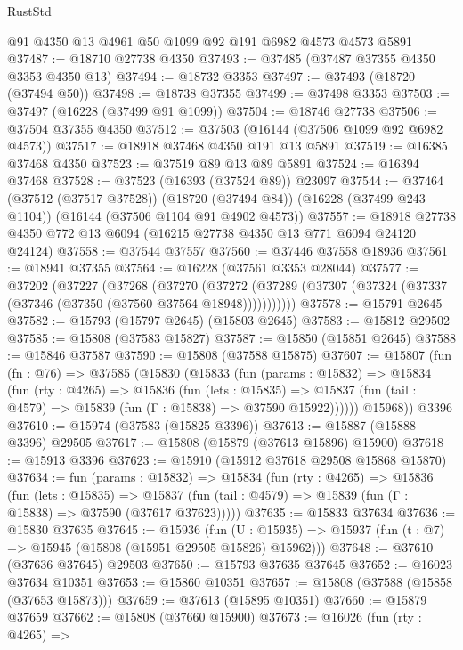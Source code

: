 \begin{lexlean}{RustStd}
\begin{coremodule}
    @91
    @4350
    @13
    @4961
    @50
    @1099
    @92
    @191
    @6982
    @4573
    @4573
    @5891
@37487 := @18710 @27738 @4350
@37493 := @37485 (@37487 @37355 @4350 @3353 @4350 @13)
@37494 := @18732 @3353
@37497 := @37493 (@18720 (@37494 @50))
@37498 := @18738 @37355
@37499 := @37498 @3353
@37503 := @37497 (@16228 (@37499 @91 @1099))
@37504 := @18746 @27738
@37506 := @37504 @37355 @4350
@37512 := @37503 (@16144 (@37506 @1099 @92 @6982 @4573))
@37517 := @18918 @37468 @4350 @191 @13 @5891
@37519 := @16385 @37468 @4350
@37523 := @37519 @89 @13 @89 @5891
@37524 := @16394 @37468
@37528 := @37523 (@16393 (@37524 @89)) @23097
@37544 := @37464
    (@37512 (@37517 @37528))
    (@18720 (@37494 @84))
    (@16228 (@37499 @243 @1104))
    (@16144 (@37506 @1104 @91 @4902 @4573))
@37557 := @18918 @27738 @4350 @772 @13 @6094 (@16215 @27738 @4350 @13 @771 @6094 @24120 @24124)
@37558 := @37544 @37557
@37560 := @37446 @37558 @18936
@37561 := @18941 @37355
@37564 := @16228 (@37561 @3353 @28044)
@37577 := @37202
    (@37227
      (@37268
        (@37270
          (@37272 (@37289 (@37307 (@37324 (@37337 (@37346 (@37350 (@37560 @37564 @18948)))))))))))
@37578 := @15791 @2645
@37582 := @15793 (@15797 @2645) (@15803 @2645)
@37583 := @15812 @29502
@37585 := @15808 (@37583 @15827)
@37587 := @15850 (@15851 @2645)
@37588 := @15846 @37587
@37590 := @15808 (@37588 @15875)
@37607 := @15807
    (fun (fn : @76) =>
    @37585
      (@15830
        (@15833
          (fun (params : @15832) =>
          @15834
            (fun (rty : @4265) =>
            @15836
              (fun (lets : @15835) =>
              @15837 (fun (tail : @4579) => @15839 (fun (Γ : @15838) => @37590 @15922))))))
        @15968))
    @3396
@37610 := @15974 (@37583 (@15825 @3396))
@37613 := @15887 (@15888 @3396) @29505
@37617 := @15808 (@15879 (@37613 @15896) @15900)
@37618 := @15913 @3396
@37623 := @15910 (@15912 @37618 @29508 @15868 @15870)
@37634 := fun (params : @15832) =>
  @15834
    (fun (rty : @4265) =>
    @15836
      (fun (lets : @15835) =>
      @15837 (fun (tail : @4579) => @15839 (fun (Γ : @15838) => @37590 (@37617 @37623)))))
@37635 := @15833 @37634
@37636 := @15830 @37635
@37645 := @15936
    (fun (U : @15935) => @15937 (fun (t : @7) => @15945 (@15808 (@15951 @29505 @15826) @15962)))
@37648 := @37610 (@37636 @37645) @29503
@37650 := @15793 @37635 @37645
@37652 := @16023 @37634 @10351
@37653 := @15860 @10351
@37657 := @15808 (@37588 (@15858 (@37653 @15873)))
@37659 := @37613 (@15895 @10351)
@37660 := @15879 @37659
@37662 := @15808 (@37660 @15900)
@37673 := @16026
    (fun (rty : @4265) =>

\end{coremodule}
\end{lexlean}
